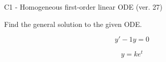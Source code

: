 \begin{exercise}
  \begin{exerciseTitle}C1 - Homogeneous first-order linear ODE (ver. 27)\end{exerciseTitle}
  \begin{exerciseStatement}
    
Find the general solution to the given ODE.

    
\[y'-1y=0\]

  \end{exerciseStatement}
  \begin{exerciseAnswer}
    
\[y= k e^{t}\]

  \end{exerciseAnswer}
\end{exercise}